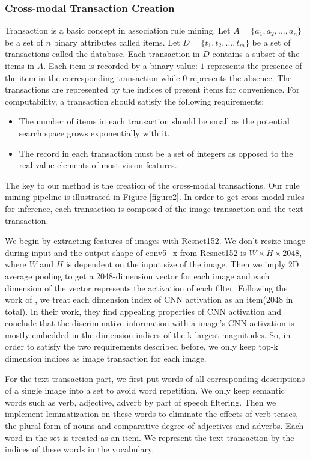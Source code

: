 \documentclass[sigconf]{acmart}
\begin{document}
\subsubsection{Cross-modal Transaction Creation}
 Transaction is a basic concept in association rule mining. Let $A=\{a_1, a_2, ..., a_n\}$ be a set of $n$ binary attributes called items. Let $D=\{t_1, t_2, ..., t_m\}$ be a set of transactions called the database. Each transaction in $D$ contains a subset of the items in $A$. Each item is recorded by a binary value: $1$ represents the presence of the item in the corresponding transaction while $0$ represents the absence. The transactions are represented by the indices of present items for convenience.
 For computability, a transaction should satisfy the following requirements:
\begin{itemize}
    \item The number of items in each transaction should be small as the potential search space grows exponentially with it.
    \item The record in each transaction must be a set of integers as opposed to the real-value elements of most vision features.
\end{itemize}


The key to our method is the creation of the cross-modal transactions. Our rule mining pipeline is illustrated in Figure \ref{figure2}. In order to get cross-modal rules for inference, each transaction is composed of the image transaction and the text transaction. 

We begin by extracting features of images with Resnet152\cite{he2016deep}. We don't resize image during input and the output shape of conv5\_x from Resnet152 is $W\times H \times 2048$, where $W$ and $H$ is dependent on the input size of the image. Then we imply 2D average pooling to get a 2048-dimension vector for each image and each dimension of the vector represents the activation of each filter. Following the work of \cite{li2015mid}, we treat each dimension index of CNN activation as an item(2048 in total). In their work, they find appealing properties of CNN activation and conclude that the discriminative information with a image's CNN activation is mostly embedded in the dimension indices of the k largest magnitudes. So, in order to satisfy the two requirements described before, we only keep top-k dimension indices as image transaction for each image.

For the text transaction part, we first put words of all corresponding descriptions of a single image into a set to avoid word repetition. We only keep semantic words such as verb, adjective, adverb by part of speech filtering. Then we implement lemmatization on these words to eliminate the effects of verb tenses, the plural form of nouns and comparative degree of adjectives and adverbs. Each word in the set is treated as an item. We represent the text transaction by the indices of these words in the vocabulary.
\end{document}
